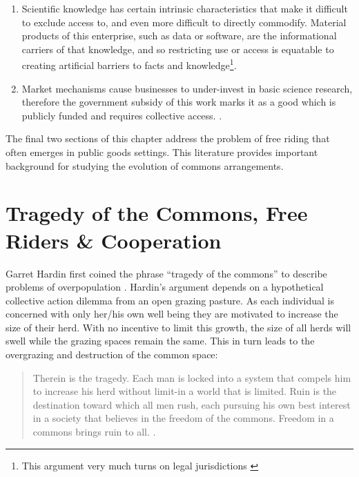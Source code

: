 \documentclass[thesis,tocnosub,noragright,centerchapter,12pt]{uiucecethesis09}
\begin{document}
\begin{enumerate}
\def\labelenumi{\arabic{enumi}.}
\item
  Scientific knowledge has certain intrinsic characteristics that make
  it difficult to exclude access to, and even more difficult to directly
  commodify. Material products of this enterprise, such as data or
  software, are the informational carriers of that knowledge, and so
  restricting use or access is equatable to creating artificial barriers
  to facts and knowledge\footnote{This argument very much turns on legal jurisdictions \citep[see][for USA precedence]{copyright1998us} }.
\item
  Market mechanisms cause businesses to under-invest in basic science
  research, therefore the government subsidy of this work marks it as a
  good which is publicly funded and requires collective access. 
  \citep{callon1994science}.
\end{enumerate}

The final two sections of this chapter address the problem of free riding that often
emerges in public goods settings. This literature provides important
background for studying the evolution of commons arrangements.\\

\section{Tragedy of the Commons, Free Riders \& Cooperation}

Garret Hardin first coined the phrase ``tragedy of the commons'' to
describe problems of overpopulation \citeyear{hardin1968tragedy}. Hardin's argument depends on
a hypothetical collective action dilemma from an open grazing pasture.
As each individual is concerned with only her/his own well being they
are motivated to increase the size of their herd. With no incentive to
limit this growth, the size of all herds will swell while the grazing
spaces remain the same. This in turn leads to the overgrazing and
destruction of the common space:

\begin{quote}
Therein is the tragedy. Each man is locked into a system that compels
him to increase his herd without limit-in a world that is limited. Ruin
is the destination toward which all men rush, each pursuing his own best
interest in a society that believes in the freedom of the commons.
Freedom in a commons brings ruin to all. \citep[p. 1244]{hardin1968tragedy}.
\end{quote}
\end{document}
